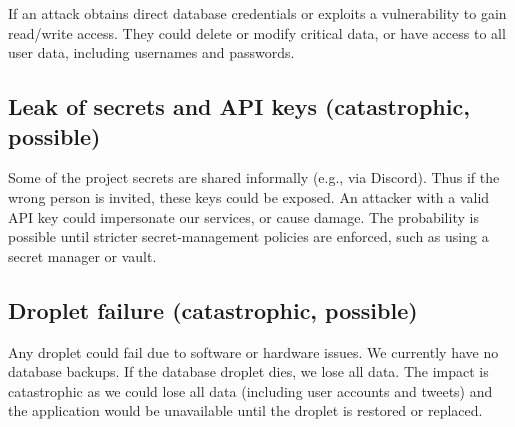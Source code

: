 If an attack obtains direct database credentials or exploits a 
vulnerability to gain read/write access. They could delete or modify 
critical data, or have access to all user data, including usernames 
and passwords.

\subsection{Leak of secrets and API keys (catastrophic, possible)}

Some of the project secrets are shared informally (e.g., via Discord). 
Thus if the wrong person is invited, these keys could be exposed. 
An attacker with a valid API key could impersonate our services, 
or cause damage. The probability is possible until stricter 
secret-management policies are enforced, 
such as using a secret manager or vault.

\subsection{Droplet failure (catastrophic, possible)}

Any droplet could fail due to software or hardware issues. We currently have 
no database backups. If the database droplet dies, we lose all data. 
The impact is catastrophic as we could lose all data (including user accounts 
and tweets) and the application would be unavailable until the droplet is 
restored or replaced.
